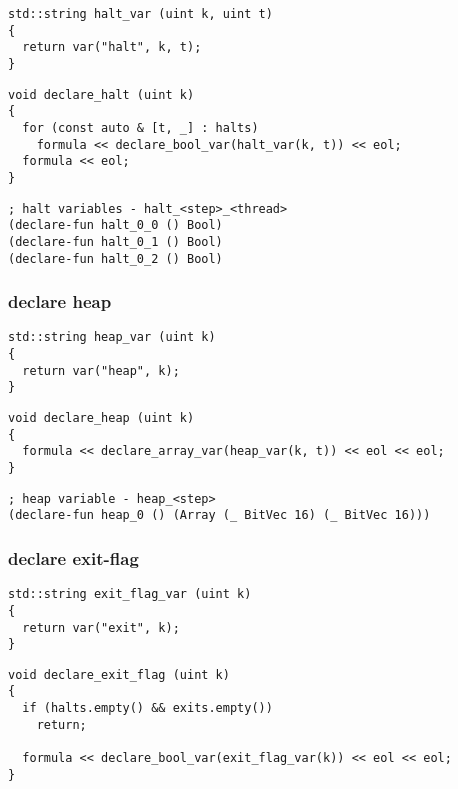 \begin{lstlisting}[style=c++]
std::string halt_var (uint k, uint t)
{
  return var("halt", k, t);
}
\end{lstlisting}

\begin{lstlisting}[style=c++]
void declare_halt (uint k)
{
  for (const auto & [t, _] : halts)
    formula << declare_bool_var(halt_var(k, t)) << eol;
  formula << eol;
}
\end{lstlisting}

\begin{lstlisting}[language=SMTLib]
; halt variables - halt_<step>_<thread>
(declare-fun halt_0_0 () Bool)
(declare-fun halt_0_1 () Bool)
(declare-fun halt_0_2 () Bool)
\end{lstlisting}

\subsubsection{declare heap}

\begin{lstlisting}[style=c++]
std::string heap_var (uint k)
{
  return var("heap", k);
}
\end{lstlisting}

\begin{lstlisting}[style=c++]
void declare_heap (uint k)
{
  formula << declare_array_var(heap_var(k, t)) << eol << eol;
}
\end{lstlisting}

\begin{lstlisting}[language=SMTLib]
; heap variable - heap_<step>
(declare-fun heap_0 () (Array (_ BitVec 16) (_ BitVec 16)))
\end{lstlisting}

\subsubsection{declare exit-flag}

\begin{lstlisting}[style=c++]
std::string exit_flag_var (uint k)
{
  return var("exit", k);
}
\end{lstlisting}

\begin{lstlisting}[style=c++]
void declare_exit_flag (uint k)
{
  if (halts.empty() && exits.empty())
    return;

  formula << declare_bool_var(exit_flag_var(k)) << eol << eol;
}
\end{lstlisting}

